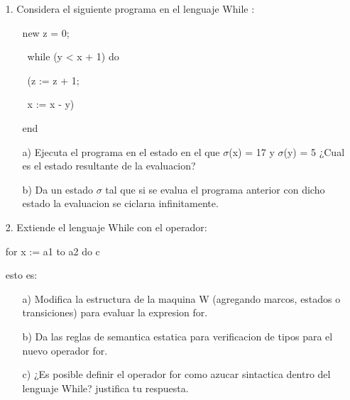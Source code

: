 \documentclass{article}
\begin{document}
    \begin{itemize}
        \item[1.] Considera el siguiente programa en el lenguaje While :
        \begin{itemize}
            \item[ ] new z = 0;
            \item[ ] \, while (y < x + 1) do
            \item[ ] \, (z := z + 1;
            \item[ ] \, x := x - y)
            \item[ ] end
        \end{itemize}

        \begin{itemize}
            \item[a)] Ejecuta el programa en el estado en el que $\sigma$(x) = 17 y $\sigma$(y) = 5 ¿Cual es el estado resultante de la evaluacion?
            \item[b)] Da un estado $\sigma$ tal que si se evalua el programa anterior con dicho estado la evaluacion se ciclarıa infinitamente.
        \end{itemize}

        \item[2.] Extiende el lenguaje While con el operador:
        \begin{center}
        for x := a1 to a2 do c
        \end{center}
        esto es:
        \begin{itemize}
            \item[a)] Modifica la estructura de la maquina W (agregando marcos, estados o transiciones) para evaluar la expresion for.
            \item[b)] Da las reglas de semantica estatica para verificacion de tipos para el nuevo operador for.
            \item[c)] ¿Es posible definir el operador for como azucar sintactica dentro del lenguaje While? justifica tu respuesta.
        \end{itemize}


\end{itemize}
\end{document}
